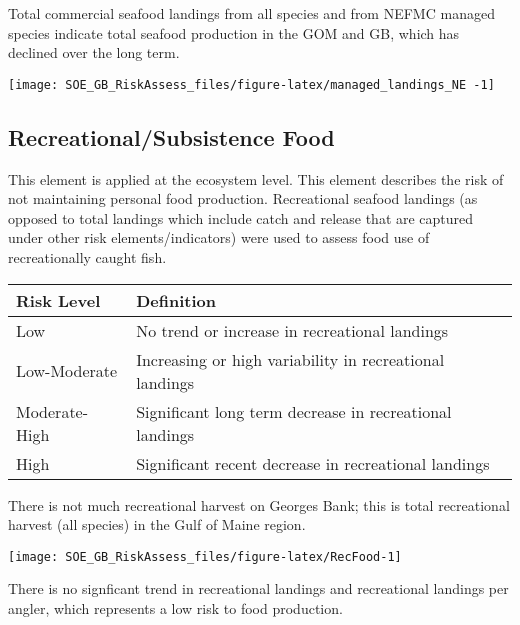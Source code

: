 \documentclass[11pt,]{article}
\let\origfigure\figure
\let\endorigfigure\endfigure
\renewenvironment{figure}[1][2] {
    \expandafter\origfigure\expandafter[H]
} {
    \endorigfigure
}
\begin{document}
Total commercial seafood landings from all species and from NEFMC
managed species indicate total seafood production in the GOM and GB,
which has declined over the long term.

\begin{figure}

{\centering \texttt{[image: SOE\_GB\_RiskAssess\_files/figure-latex/managed\_landings\_NE -1]} 

}

\caption{Total landings (black) and total landings managed by NEFMC (red) in Gulf of Maine (A) and Georges Bank (B).}\label{fig:managed_landings_NE }
\end{figure}

\subsection{Recreational/Subsistence
Food}\label{recreationalsubsistence-food}

This element is applied at the ecosystem level. This element describes
the risk of not maintaining personal food production. Recreational
seafood landings (as opposed to total landings which include catch and
release that are captured under other risk elements/indicators) were
used to assess food use of recreationally caught fish.

\begin{longtable}[]{@{}ll@{}}
\toprule
Risk Level & Definition\tabularnewline
\midrule
\endhead
Low & No trend or increase in recreational landings\tabularnewline
Low-Moderate & Increasing or high variability in recreational
landings\tabularnewline
Moderate-High & Significant long term decrease in recreational
landings\tabularnewline
High & Significant recent decrease in recreational
landings\tabularnewline
\bottomrule
\end{longtable}

There is not much recreational harvest on Georges Bank; this is total
recreational harvest (all species) in the Gulf of Maine region.

\begin{figure}

{\centering \texttt{[image: SOE\_GB\_RiskAssess\_files/figure-latex/RecFood-1]} 

}

\caption{A: Total recreational harvest, B: Harvest per angler  \label{recfood}}\label{fig:RecFood}
\end{figure}

There is no signficant trend in recreational landings and recreational
landings per angler, which represents a low risk to food production.
\end{document}
